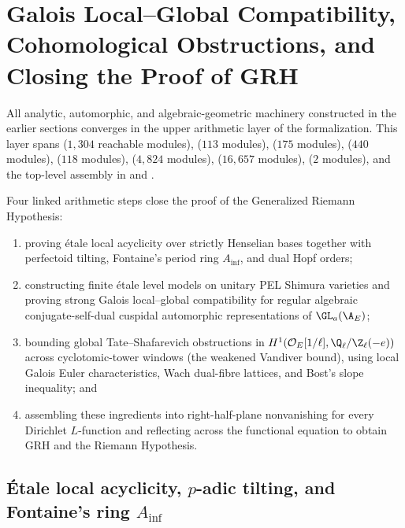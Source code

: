\section{Galois Local--Global Compatibility, Cohomological Obstructions, and Closing the Proof of GRH}
\label{sec:galois-cohomology-assembly}

All analytic, automorphic, and algebraic-geometric machinery constructed in the
earlier sections converges in the upper arithmetic layer of the formalization.
This layer spans  ($1{,}304$ reachable
modules),  ($113$ modules),
 ($175$ modules),
 ($440$ modules),
 ($118$ modules),
 ($4{,}824$ modules),
 ($16{,}657$ modules),
 ($2$ modules), and the top-level
assembly in  and .

Four linked arithmetic steps close the proof of the Generalized Riemann
Hypothesis:
\begin{enumerate}
  \item proving étale local acyclicity over strictly Henselian bases together
  with perfectoid tilting, Fontaine's period ring $A_{\mathrm{inf}}$, and dual
  Hopf orders;
  \item constructing finite étale level models on unitary PEL Shimura varieties
  and proving strong Galois local--global compatibility for regular algebraic
  conjugate-self-dual cuspidal automorphic representations of $\GL_a(\A_E)$;
  \item bounding global Tate--Shafarevich obstructions in
  $H^1(\mathcal{O}_E[1/\ell], \Q_\ell/\Z_\ell(-e))$ across cyclotomic-tower
  windows (the weakened Vandiver bound), using local Galois Euler
  characteristics, Wach dual-fibre lattices, and Bost's slope inequality; and
  \item assembling these ingredients into right-half-plane nonvanishing for
  every Dirichlet $L$-function and reflecting across the functional equation to
  obtain GRH and the Riemann Hypothesis.
\end{enumerate}

\subsection{Étale local acyclicity, $p$-adic tilting, and Fontaine's ring $A_{\mathrm{inf}}$}

